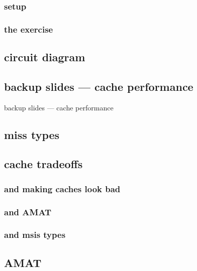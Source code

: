 \subsubsection{setup}

\subsubsection{the exercise}


\subsection{circuit diagram}



\subsection{backup slides --- cache performance}
\begin{frame}{backup slides --- cache performance}
\end{frame}

\subsection{miss types}


\subsection{cache tradeoffs}
\subsubsection{and making caches look bad}


\subsubsection{and AMAT}

\subsubsection{and msis types}


\subsection{AMAT}



